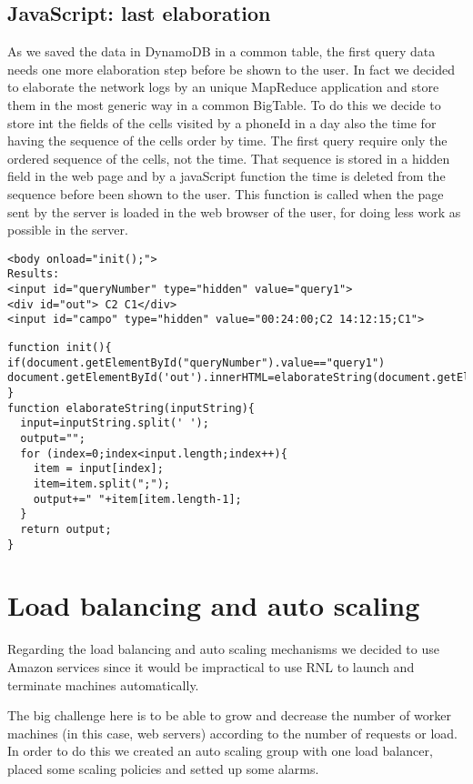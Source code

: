 \documentclass{article}
\begin{document}
\subsection{JavaScript: last elaboration}
As we saved the data in DynamoDB in a common table, the first query data needs one more elaboration step 
before be shown to the user. In fact we decided to elaborate the network logs by an unique MapReduce application
and store them in the most generic way in a common BigTable. To do this we decide to store int the fields of
the cells visited by a phoneId in a day also the time for having the sequence of the cells order by time.
The first query require only the ordered sequence of the cells, not the time. That sequence is stored in 
a hidden field in the web page and by a javaScript function the time is deleted from the sequence before 
been shown to the user. This function is called when the page sent by the server is loaded in the web 
browser of the user, for doing less work as possible in the server.
\begingroup \fontsize{7pt}{7pt}\selectfont
\begin{verbatim}
<body onload="init();">
Results:
<input id="queryNumber" type="hidden" value="query1">
<div id="out"> C2 C1</div>
<input id="campo" type="hidden" value="00:24:00;C2 14:12:15;C1">
\end{verbatim}
\begin{verbatim}
function init(){
if(document.getElementById("queryNumber").value=="query1")
document.getElementById('out').innerHTML=elaborateString(document.getElementById('campo').value);
}
function elaborateString(inputString){
  input=inputString.split(' ');
  output="";
  for (index=0;index<input.length;index++){
    item = input[index];
    item=item.split(";");
    output+=" "+item[item.length-1];
  }
  return output;
} 
\end{verbatim}
 \endgroup

\section{Load balancing and auto scaling}

Regarding the load balancing and auto scaling mechanisms we decided to use Amazon services since it would be impractical to use RNL to launch and terminate machines automatically. 

The big challenge here is to be able to grow and decrease the number of worker machines (in this case, web servers) according to the number of requests or load. In order to do this we created an auto scaling group with one load balancer, placed some scaling policies and setted up some alarms. 
\end{document}
